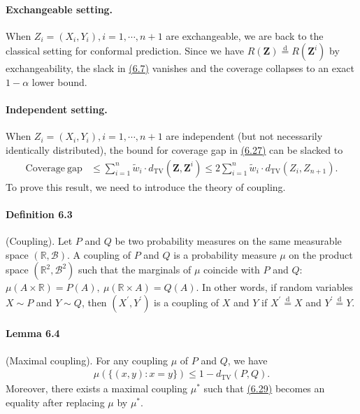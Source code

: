 \documentclass{article}
\numberwithin{equation}{section}
\begin{document}
\paragraph{Exchangeable setting.} When $Z_i=(X_i,Y_i),i=1,\cdots,n+1$ are exchangeable, we are back to the classical setting for conformal prediction. Since we have $R(\mathbf{Z})\overset{\mathrm{d}}{=} R(\mathbf{Z}^i)$ by exchangeability, the slack in \hyperref[6.7]{(6.7)} vanishes and the coverage collapses to an exact $1-\alpha$ lower bound.


\paragraph{Independent setting.} When $Z_i=(X_i,Y_i),i=1,\cdots,n+1$ are independent (but not necessarily identically distributed), the bound for coverage gap in \hyperref[6.27]{(6.27)} can be slacked to
\begin{align*}
	\mathrm{Coverage\ gap} &\leq \sum_{i=1}^n\widetilde{w}_i\cdot d_\mathrm{TV}\left(\mathbf{Z},\mathbf{Z}^i\right) \leq 2\sum_{i=1}^n\widetilde{w}_i\cdot d_\mathrm{TV}(Z_i,Z_{n+1}).\tag{6.28}\label{6.28}
\end{align*}
To prove this result, we need to introduce the theory of coupling.

\paragraph{Definition 6.3} (Coupling). Let $P$ and $Q$ be two probability measures on the same measurable space $(\mathbb{R},\mathcal{B})$. A coupling of $P$ and $Q$ is a probability measure $\mu$ on the product space $(\mathbb{R}^2,\mathcal{B}^2)$ such that the marginals of $\mu$ coincide with $P$ and $Q$: $\mu(A\times\mathbb{R})=P(A),\ \mu(\mathbb{R}\times A)=Q(A)$. In other words, if random variables $X\sim P$ and $Y\sim Q$, then $(X^\prime,Y^\prime)$ is a coupling of $X$ and $Y$ if $X^\prime\overset{\mathrm{d}}{=}X$ and $Y^\prime\overset{\mathrm{d}}{=}Y$.

\paragraph{Lemma 6.4 \label{Lemma 6.4}} (Maximal coupling). For any coupling $\mu$ of $P$ and $Q$, we have
\begin{align*}
	\mu(\{(x,y):x=y\}) \leq 1 - d_\mathrm{TV}(P,Q).\tag{6.29}\label{6.29}
\end{align*}
Moreover, there exists a maximal coupling $\mu^*$ such that \hyperref[6.29]{(6.29)} becomes an equality after replacing $\mu$ by $\mu^*$.
\end{document}
